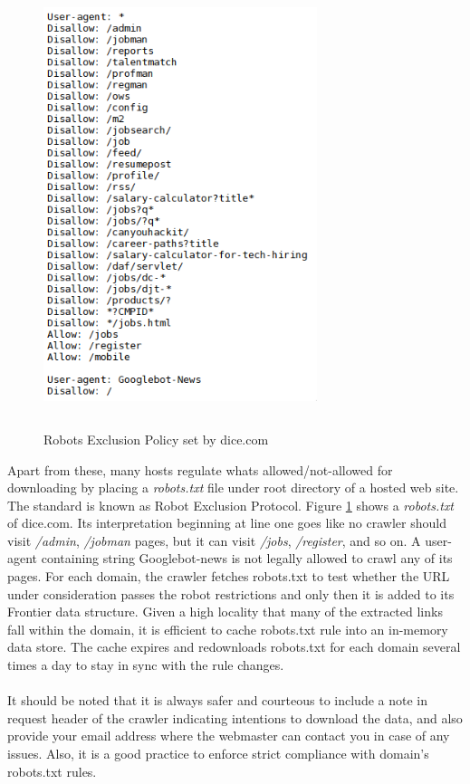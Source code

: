 \begin{figure}[h!]
  \centering
  \includegraphics[width=8cm,height=13cm,keepaspectratio]{../media/crawler/robots-txt-sample.png}
  \caption{Robots Exclusion Policy set by dice.com}
  \label{fig:robotsdice}
\end{figure}

\noindent
Apart from these, many hosts regulate whats allowed/not-allowed for downloading by placing a \textit{robots.txt} file under root directory of a hosted web site. The standard is known as Robot Exclusion Protocol.
Figure \ref{fig:robotsdice} shows a \textit{robots.txt} of dice.com. Its interpretation beginning at line one goes like no crawler should visit \textit{/admin}, \textit{/jobman} pages, but it can visit \textit{/jobs},
\textit{/register}, and so on. A user-agent containing string Googlebot-news is not legally allowed to
crawl  any of its pages. For each domain, the crawler fetches robots.txt to test whether the URL under consideration passes the robot restrictions and only then it is added to its Frontier data structure. Given a
high locality that many of the extracted links fall within the domain, it is efficient to cache robots.txt rule into an in-memory data store. The cache expires and redownloads robots.txt for each domain several times a day to stay in sync with the rule changes.
\\
\\
It should be noted that it is always safer and courteous to include a note in request header of the crawler indicating intentions to download the data, and also provide your email address where the webmaster can contact you in case of any issues. Also, it is a good practice to enforce strict compliance with domain's robots.txt rules.

